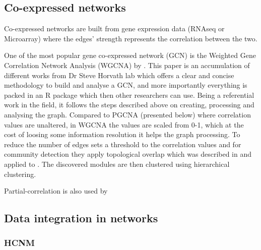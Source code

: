 \subsection{Co-expressed networks} \label{s:lit:co_net}

Co-expressed networks are built from gene expression data (RNAseq or Microarray) where the edges' strength represents the correlation between the two. 



One of the most popular gene co-expressed network (GCN) is the Weighted Gene Correlation Network Analysis (WGCNA) by \citet{Langfelder2008-sn}. This paper is an accumulation of different works from Dr Steve Horvath lab which offers a clear and concise methodology to build and analyse a GCN, and more importantly everything is packed in an R package which then other researchers can use. Being a referential work in the field, it follows the steps described above on creating, processing and analysing the graph. Compared to PGCNA (presented below) where correlation values are unaltered, in WGCNA the values are scaled from 0-1, which at the cost of loosing some information resolution it helps the graph processing. To reduce the number of edges \citet{Langfelder2008-sn} sets a threshold to the correlation values and for community detection they apply topological overlap which was described in\citet{Zhang2005-xq} and applied to \citet{Yip2007-mr, Li2007-vz, Ravasz2002-au}. The discovered modules are then clustered using hierarchical clustering.

Partial-correlation is also used by \citet{De_la_Fuente2004-ts}




\subsection{Data integration in networks}

\subsubsection{HCNM}

